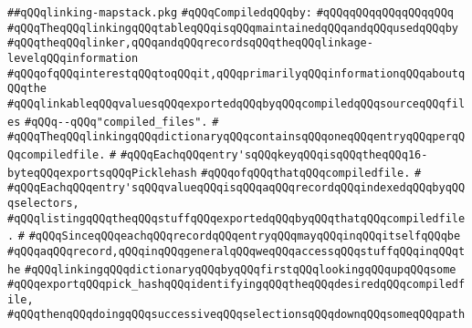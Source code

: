 \label{src/lib/compiler/execution/linking-mapstack/linking-mapstack.pkg}
\verb|##qQQqlinking-mapstack.pkg|\newline
\newline
\verb|#qQQqCompiledqQQqby:|\newline
\verb|#qQQqqQQqqQQqqQQqqQQq|\newline
\newline
\newline
\verb|#qQQqTheqQQqlinkingqQQqtableqQQqisqQQqmaintainedqQQqandqQQqusedqQQqby|\newline
\verb|#qQQqtheqQQqlinker,qQQqandqQQqrecordsqQQqtheqQQqlinkage-levelqQQqinformation|\newline
\verb|#qQQqofqQQqinterestqQQqtoqQQqit,qQQqprimarilyqQQqinformationqQQqaboutqQQqthe|\newline
\verb|#qQQqlinkableqQQqvaluesqQQqexportedqQQqbyqQQqcompiledqQQqsourceqQQqfiles|\newline
\verb|#qQQq--qQQq"compiled_files".|\newline
\verb|#|\newline
\verb|#qQQqTheqQQqlinkingqQQqdictionaryqQQqcontainsqQQqoneqQQqentryqQQqperqQQqcompiledfile.|\newline
\verb|#|\newline
\verb|#qQQqEachqQQqentry'sqQQqkeyqQQqisqQQqtheqQQq16-byteqQQqexportsqQQqPicklehash|\newline
\verb|#qQQqofqQQqthatqQQqcompiledfile.|\newline
\verb|#|\newline
\verb|#qQQqEachqQQqentry'sqQQqvalueqQQqisqQQqaqQQqrecordqQQqindexedqQQqbyqQQqselectors,|\newline
\verb|#qQQqlistingqQQqtheqQQqstuffqQQqexportedqQQqbyqQQqthatqQQqcompiledfile.|\newline
\verb|#|\newline
\verb|#qQQqSinceqQQqeachqQQqrecordqQQqentryqQQqmayqQQqinqQQqitselfqQQqbe|\newline
\verb|#qQQqaqQQqrecord,qQQqinqQQqgeneralqQQqweqQQqaccessqQQqstuffqQQqinqQQqthe|\newline
\verb|#qQQqlinkingqQQqdictionaryqQQqbyqQQqfirstqQQqlookingqQQqupqQQqsome|\newline
\verb|#qQQqexportqQQqpick_hashqQQqidentifyingqQQqtheqQQqdesiredqQQqcompiledfile,|\newline
\verb|#qQQqthenqQQqdoingqQQqsuccessiveqQQqselectionsqQQqdownqQQqsomeqQQqpath|\newline
